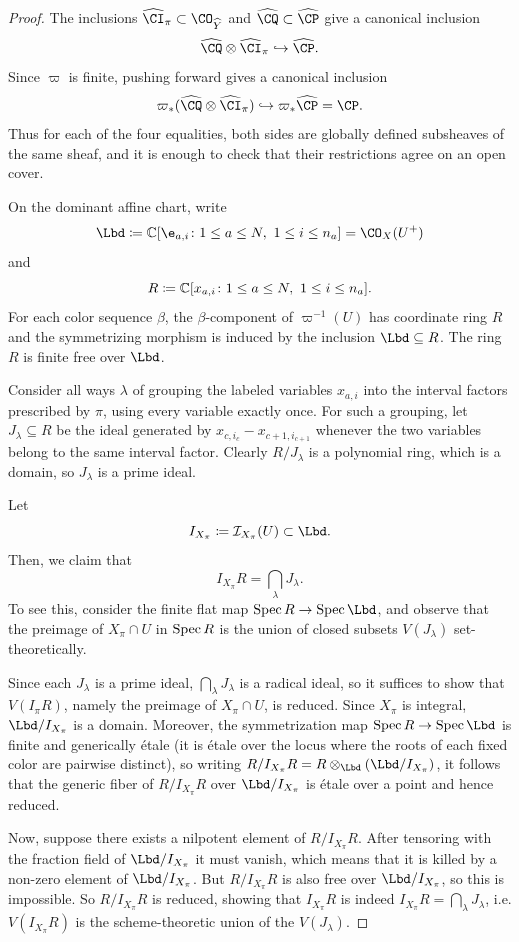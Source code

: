 \documentclass[11pt,reqno]{amsart}
\begin{document}
\begin{proof}
The inclusions $\widehat{\CI}_\pi\subset \CO_{\widehat Y}$ and $\widehat{\CQ}\subset \widehat{\CP}$
give a canonical inclusion
\[
\widehat{\CQ}\otimes\widehat{\CI}_\pi
\hookrightarrow\widehat{\CP}.
\]
Since $\varpi$ is finite, pushing forward gives a canonical inclusion
\[\varpi_*(\widehat{\CQ}\otimes\widehat{\CI}_\pi)\hookrightarrow\varpi_*\widehat{\CP}=\CP.\]
Thus for each of the four equalities, both sides are globally defined
subsheaves of the same sheaf, and it is enough to check that their restrictions
agree on an open cover.

On the dominant affine chart, write
\[\Lbd\coloneqq \BC[\e_{a,i}\colon 1\le a\le N,\ 1\le i\le n_a]=\CO_X(U^+)\]
and \[R\coloneqq \mathbb C[x_{a,i}\colon 1\le a\le N,\ 1\le i\le n_a].
\]
For each color sequence $\beta$, the $\beta$-component of $\varpi^{-1}(U)$ has coordinate ring $R$ and the symmetrizing morphism is induced by the inclusion
$\Lbd\subseteq R$. The ring $R$ is finite free over $\Lbd$.

Consider all ways $\lambda$ of grouping the labeled variables
$x_{a,i}$ into the interval factors prescribed by $\pi$, using every
variable exactly once. For such a grouping, let
$J_\lambda\subseteq R$ be the ideal generated by $x_{c,i_c}-x_{c+1,i_{c+1}}$ whenever the two variables belong to the same interval factor. Clearly $R/J_\lambda$ is a polynomial ring, which is a domain, so $J_\lambda$ is a prime ideal.

Let \[I_{X_\pi} \coloneqq \mathcal I_{X_\pi}(U)\subset \Lbd.\] Then, we claim that \[I_{X_\pi} R=\bigcap_\lambda J_\lambda.\] To see this, consider the finite flat map $\Spec R\to \Spec \Lbd$, and observe that the preimage of $X_\pi \cap U$ in $\operatorname{Spec} R$ is the union of closed subsets $V(J_\lambda)$ set-theoretically.

Since each $J_\lambda$ is a prime ideal, $\bigcap_\lambda J_\lambda$ is a radical ideal, so it suffices to show that $V(I_\pi R)$, namely the preimage of $X_\pi \cap U$, is reduced. Since $X_\pi$ is integral, $\Lbd/I_{X_\pi}$ is a domain. Moreover, the symmetrization map $\Spec R\to \Spec \Lbd$ is finite and generically \'etale (it is \'etale over the locus where the roots of each fixed color are pairwise distinct), so writing $R/I_{X_\pi} R=R\otimes_\Lbd (\Lbd/I_{X_\pi})$, it follows that the generic fiber of $R/I_{X_\pi} R$ over $\Lbd/I_{X_\pi}$ is \'etale over a point and hence reduced.

Now, suppose there exists a nilpotent element of $R/I_{X_\pi} R$. After tensoring with the fraction field of $\Lbd/I_{X_\pi}$ it must vanish, which means that it is killed by a non-zero element of $\Lbd/I_{X_\pi}$. But $R/I_{X_\pi} R$ is also free over $\Lbd/I_{X_\pi}$, so this is impossible. So $R/I_{X_\pi} R$ is reduced, showing that $I_{X_\pi} R$ is indeed $I_{X_\pi} R=\bigcap_\lambda J_\lambda$, i.e. $V(I_{X_\pi} R)$ is the scheme-theoretic union of the $V(J_\lambda)$.


\end{proof}
\end{document}

